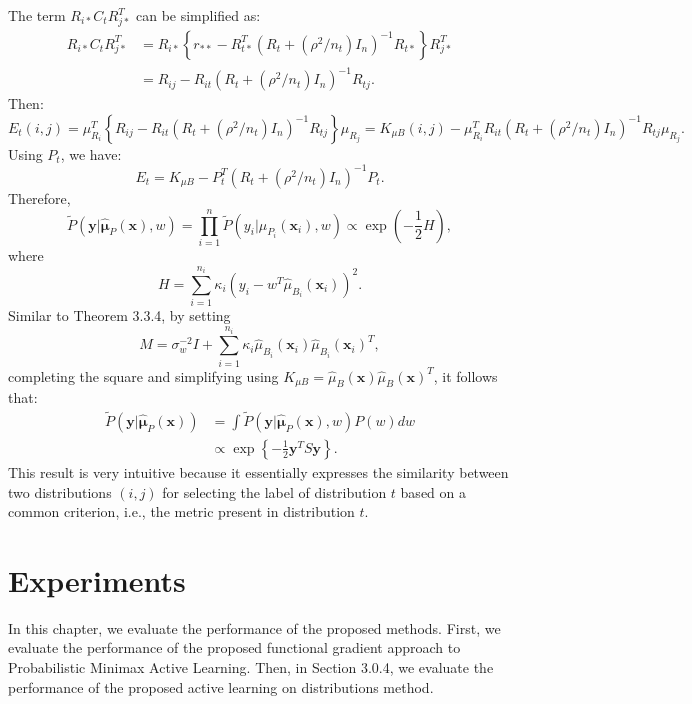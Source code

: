 	The term $R_{i*} C_t R_{j*}^T$ can be simplified as:
	\begin{align}
		R_{i*} C_t R_{j*}^T &= R_{i*} \left\{ r_{**} - R_{t*}^T (R_t + (\rho^2 / n_t) I_n)^{-1} R_{t*} \right\} R_{j*}^T \\
		&= R_{ij} - R_{it} (R_t + (\rho^2 / n_t) I_n)^{-1} R_{tj}.
	\end{align}
	Then:
	\begin{equation}
		E_t(i, j) = \mu_{R_i}^T \left\{ R_{ij} - R_{it} (R_t + (\rho^2 / n_t) I_n)^{-1} R_{tj} \right\} \mu_{R_j} = K_{\mu B}(i, j) - \mu_{R_i}^T R_{it} (R_t + (\rho^2 / n_t) I_n)^{-1} R_{tj} \mu_{R_j}.
	\end{equation}
	Using $P_t$, we have:
	\begin{equation}
		E_t = K_{\mu B} - P_t^T (R_t + (\rho^2 / n_t) I_n)^{-1} P_t.
	\end{equation}
	Therefore,
	\begin{equation}
		\tilde{P}(\mathbf{y}|\hat{\boldsymbol{\mu}}_P(\mathbf{x}), w) = \prod_{i=1}^{n} \tilde{P}(y_i | \hat{\mu}_{P_i}(\mathbf{x}_i), w) \propto \exp\left( -\frac{1}{2} H \right),
	\end{equation}
	where
	\begin{equation}
		H = \sum_{i=1}^{n_i} \kappa_i (y_i - w^T \hat{\mu}_{B_i}(\mathbf{x}_i))^2.
	\end{equation}
	Similar to Theorem 3.3.4, by setting
	\begin{equation}
		M = \sigma_w^{-2} I + \sum_{i=1}^{n_i} \kappa_i \hat{\mu}_{B_i}(\mathbf{x}_i) \hat{\mu}_{B_i}(\mathbf{x}_i)^T,
	\end{equation}
	completing the square and simplifying using $K_{\mu B} = \hat{\mu}_B(\mathbf{x}) \hat{\mu}_B(\mathbf{x})^T$, it follows that:
	\begin{align}
		\tilde{P}(\mathbf{y}|\hat{\boldsymbol{\mu}}_P(\mathbf{x})) &= \int \tilde{P}(\mathbf{y}|\hat{\boldsymbol{\mu}}_P(\mathbf{x}), w) P(w) dw \\
		&\propto \exp\left\{ -\frac{1}{2} \mathbf{y}^T S \mathbf{y} \right\}.
	\end{align}
	This result is very intuitive because it essentially expresses the similarity between two distributions $(i, j)$ for selecting the label of distribution $t$ based on a common criterion, i.e., the metric present in distribution $t$.
	
	\chapter{Experiments}
	In this chapter, we evaluate the performance of the proposed methods. First, we evaluate the performance of the proposed functional gradient approach to Probabilistic Minimax Active Learning. Then, in Section 3.0.4, we evaluate the performance of the proposed active learning on distributions method.
	

